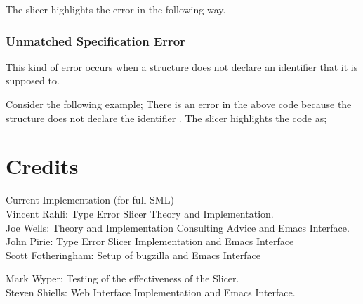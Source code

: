 \documentclass{article}
\begin{document}
\begin{itemize}
The slicer highlights the error in the following way.


\newpage


\subsubsection{Unmatched Specification Error}

\subitem This kind of error occurs when a structure does not declare
an identifier that it is supposed to.

Consider the following example;
There is an error in the above code because the structure
 does not declare the identifier .
The slicer highlights the code as;

\end{itemize}

\section {Credits}
Current Implementation (for full SML)\\

	Vincent Rahli: Type Error Slicer Theory and Implementation.\\

	Joe Wells: Theory and Implementation Consulting Advice and Emacs
   		   Interface.\\

	John Pirie: Type Error Slicer Implementation and Emacs Interface\\

        Scott Fotheringham: Setup of bugzilla and Emacs Interface

        Mark Wyper: Testing of the effectiveness of the Slicer.\\

	Steven Shiells: Web Interface Implementation and Emacs Interface.\\
\end{document}
